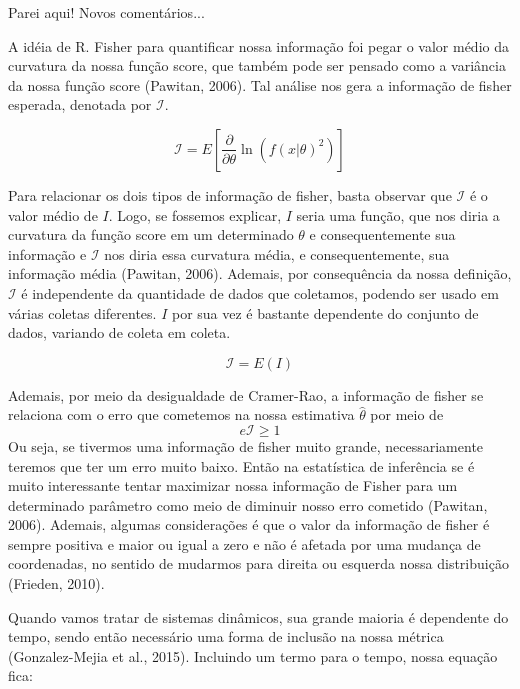 \documentclass{article}[12pt]
\begin{document}
{\color{red} Parei aqui! Novos comentários...}

A idéia de R. Fisher para quantificar nossa informação foi pegar o
valor médio da curvatura da nossa função score, que também pode ser pensado como a variância da
nossa função score (Pawitan, 2006). Tal análise nos gera a informação de fisher esperada, denotada por \(\mathcal{I} \). \par

\begin{equation}
    \mathcal{I} = E\left[\frac{\partial}{\partial \theta } \ln (f(x| \theta)^{2})\right]
\end{equation}

Para relacionar os dois tipos de informação de fisher, basta observar que \(\mathcal{I} \) é o valor
médio de \(I\). Logo, se fossemos explicar, \(I\) seria uma função, que nos diria a curvatura da
função score em um determinado \(\theta \) e consequentemente sua informação e \(\mathcal{I} \) nos
diria essa curvatura média, e consequentemente, sua informação média (Pawitan, 2006). Ademais, por consequência da
nossa definição, \(\mathcal{I} \) é independente da quantidade de dados que coletamos, podendo ser
usado em várias coletas diferentes. \(I\) por sua vez é bastante dependente do conjunto de dados,
variando de coleta em coleta. \par

\begin{equation}
    \mathcal{I} =E(I)
\end{equation}

Ademais, por meio da desigualdade de Cramer-Rao, a informação de
fisher se relaciona com o erro que cometemos na nossa estimativa \(\hat{\theta} \) por meio de 
\begin{equation}
    e\mathcal{I} \geq 1
\end{equation}
Ou seja, se tivermos uma informação de fisher muito grande, necessariamente teremos que ter um erro
muito baixo. Então na estatística de inferência se é muito interessante tentar maximizar nossa
informação de Fisher para um determinado parâmetro como meio de diminuir nosso erro cometido (Pawitan, 2006).
Ademais, algumas considerações é que o valor da informação de fisher é sempre positiva e maior ou
igual a zero e não é afetada por uma mudança de coordenadas, no sentido de mudarmos para direita ou
esquerda nossa distribuição (Frieden, 2010).

Quando vamos tratar de sistemas dinâmicos, sua grande maioria é dependente do tempo, sendo então
necessário uma forma de inclusão na nossa métrica  (Gonzalez-Mejia et al., 2015). Incluindo um termo para o tempo, nossa equação
fica:
\end{document}
